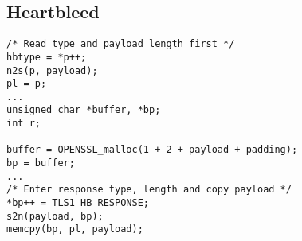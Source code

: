 \subsection{Heartbleed}

\begin{verbatim}
/* Read type and payload length first */
hbtype = *p++;
n2s(p, payload);
pl = p;
...
unsigned char *buffer, *bp;
int r;

buffer = OPENSSL_malloc(1 + 2 + payload + padding);
bp = buffer;
...
/* Enter response type, length and copy payload */
*bp++ = TLS1_HB_RESPONSE;
s2n(payload, bp);
memcpy(bp, pl, payload);
\end{verbatim}







